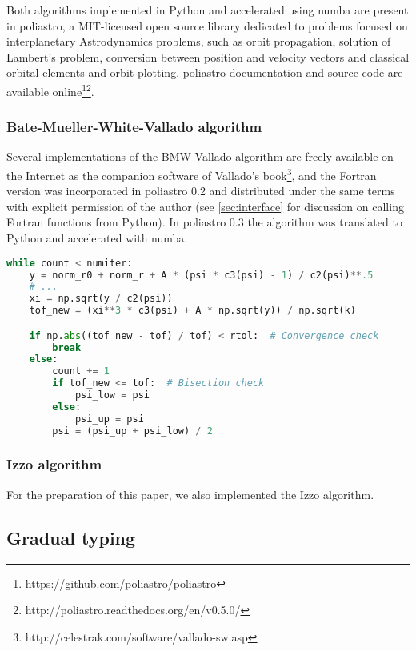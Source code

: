 
Both algorithms implemented in Python and accelerated using numba are present in poliastro, a MIT-licensed open source library dedicated to problems focused on interplanetary Astrodynamics problems, such as orbit propagation, solution of Lambert's problem, conversion between position and velocity vectors and classical orbital elements and orbit plotting. poliastro documentation and source code are available online\footnote{https://github.com/poliastro/poliastro}\footnote{http://poliastro.readthedocs.org/en/v0.5.0/}.

\subsubsection{Bate-Mueller-White-Vallado algorithm}

Several implementations of the BMW-Vallado algorithm are freely available on the Internet as the companion software of Vallado's book\footnote{http://celestrak.com/software/vallado-sw.asp}, and the Fortran version was incorporated in poliastro 0.2 and distributed under the same terms with explicit permission of the author (see \ref{sec:interface} for discussion on calling Fortran functions from Python). In poliastro 0.3 the algorithm was translated to Python and accelerated with numba.

\begin{lstlisting}[language=Python]
while count < numiter:
    y = norm_r0 + norm_r + A * (psi * c3(psi) - 1) / c2(psi)**.5
    # ...
    xi = np.sqrt(y / c2(psi))
    tof_new = (xi**3 * c3(psi) + A * np.sqrt(y)) / np.sqrt(k)

    if np.abs((tof_new - tof) / tof) < rtol:  # Convergence check
        break
    else:
        count += 1
        if tof_new <= tof:  # Bisection check
            psi_low = psi
        else:
            psi_up = psi
        psi = (psi_up + psi_low) / 2
\end{lstlisting}


\subsubsection{Izzo algorithm}

For the preparation of this paper, we also implemented the Izzo algorithm.

\subsection{Gradual typing}